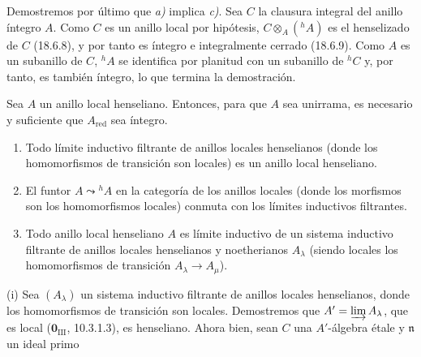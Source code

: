 Demostremos por último que \emph{a)} implica \emph{c)}. Sea $C$ la clausura integral del anillo íntegro $A$. Como $C$ es un anillo local por hipótesis, $C\otimes_A({}^h\!A)$ es el henselizado de $C$ (18.6.8), y por tanto es íntegro e integralmente cerrado (18.6.9). Como $A$ es un subanillo de $C$, ${}^h\!A$ se identifica por planitud con un subanillo de ${}^h\!C$ y, por tanto, es también íntegro, lo que termina la demostración.

\begin{corollary}[18.6.13]
\label{IV.18.6.13}
Sea $A$ un anillo local henseliano. Entonces, para que $A$ sea unirrama, es necesario y suficiente que $A_{\mathrm{red}}$ sea íntegro.
\end{corollary}

\begin{proposition}[18.6.14]
\label{IV.18.6.14}
\begin{enumerate}
  \item[\textup{(i)}] Todo límite inductivo filtrante de anillos locales henselianos (donde los homomorfismos de transición son locales) es un anillo local henseliano.
  \item[\textup{(ii)}] El funtor $A\leadsto{}^h\!A$ en la categoría de los anillos locales (donde los morfismos son los homomorfismos locales) conmuta con los límites inductivos filtrantes.
  \item[\textup{(iii)}] Todo anillo local henseliano $A$ es límite inductivo de un sistema inductivo filtrante de anillos locales henselianos y noetherianos $A_\lambda$ (siendo locales los homomorfismos de transición $A_\lambda\to A_\mu$).
\end{enumerate}
\end{proposition}

(i) Sea $(A_\lambda)$ un sistema inductivo filtrante de anillos locales henselianos, donde los homomorfismos de transición son locales. Demostremos que $A'=\varinjlim A_\lambda$, que es local ($\mathbf 0_{\mathrm{III}}$, 10.3.1.3), es henseliano. Ahora bien, sean $C$ una $A'$-álgebra étale y $\mathfrak n$ un ideal primo


